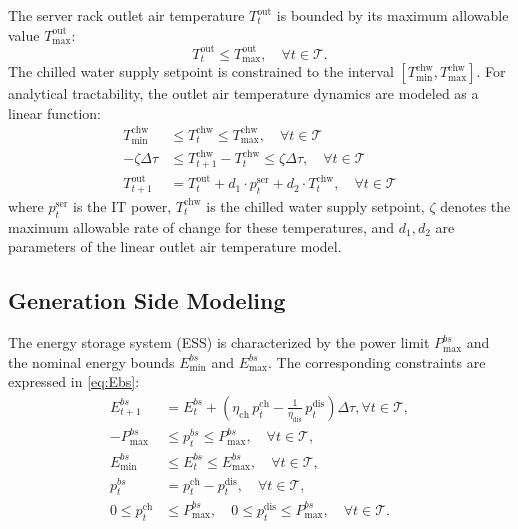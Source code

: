 \documentclass[a4paper,fleqn]{cas-dc}
\theoremstyle{plain}
\theoremstyle{remark}
\theoremstyle{plain}
\begin{document}
The server rack outlet air temperature $T_t^{\text{out}}$ is bounded by its maximum allowable value $T_{\max}^{\text{out}}$:
\begin{equation}\label{eq:T_temp}
    T_t^{\text{out}} \leq T_{\max }^{\text{out}}, \quad \forall t \in \mathcal{T}.
\end{equation}
The chilled water supply setpoint is constrained to the interval $[T_{\min}^{\text{chw}},T_{\max}^{\text{chw}}]$. For analytical tractability, the outlet air temperature dynamics are modeled as a linear function:
\begin{equation}\label{eq:Tchw}
\begin{aligned}
T_{\min }^{\text{chw}} & \leq T_t^{\text{chw}} \leq T_{\max }^{\text{chw}}, \quad \forall t\in\mathcal{T} \\
-\zeta \Delta \tau & \leq T_{t+1}^{\text{chw}}-T_{t}^{\text{chw}} \leq \zeta \Delta \tau, \quad \forall t\in\mathcal{T} \\
T_{t+1}^{\text{out}}& =T_{t}^{\text{out}} + d_1 \cdot p_t^{\text{ser}}+d_2 \cdot T_t^{\text{chw}}, \quad \forall t\in\mathcal{T}
\end{aligned}
\end{equation}
where $p^{\text{ser}}_{t}$ is the IT power, $T_t^{\text{chw}}$ is the chilled water supply setpoint, $\zeta$ denotes the maximum allowable rate of change for these temperatures, and $d_1,d_2$ are parameters of the linear outlet air temperature model.



\subsection{Generation Side Modeling}\label{subsec:gener}

The energy storage system (ESS) is characterized by the power limit $P_{\max}^{bs}$ and the nominal energy bounds $E_{\min}^{bs}$ and $E_{\max}^{bs}$. The corresponding constraints are expressed in \eqref{eq:Ebs}:
\begin{subequations}\label{eq:Ebs}
\begin{align}
E_{t+1}^{bs}
&=E_{t}^{bs}
+\!\left(
\eta_{\text{ch}}\, p_{t}^{\text{ch}}
-\frac{1}{\eta_{\text{dis}}}\, p_{t}^{\text{dis}}
\right)\Delta \tau, \forall t \in \mathcal{T},
\\
-P_{\max }^{bs}
&\leq p_t^{bs} \leq P_{\max }^{bs}, \quad \forall t \in \mathcal{T},
\\
E_{\min}^{bs}
&\leq E_t^{bs} \leq E_{\max }^{bs}, \quad \forall t \in \mathcal{T},
\label{eq:Ebs c}\\
p_t^{bs}
&=p_t^{\text{ch}}-p_t^{\text{dis}}, \quad \forall t \in \mathcal{T},
\label{eq:Ebs d}\\
0 \le p_t^{\text{ch}}
&\le P_{\max}^{bs},\quad
0 \le p_t^{\text{dis}}
\le P_{\max}^{bs}, \quad \forall t \in \mathcal{T}.
\end{align}
\end{subequations}
\end{document}
